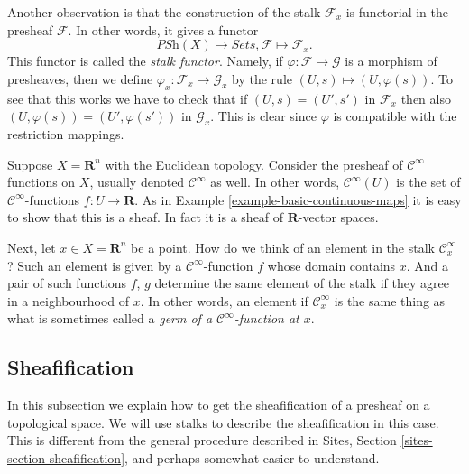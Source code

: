 \medskip\noindent
Another observation is that the construction of the stalk
$\mathcal{F}_x$ is functorial in the presheaf $\mathcal{F}$.
In other words, it gives a functor
$$
\textit{PSh}(X) \longrightarrow \textit{Sets},
\mathcal{F} \longmapsto \mathcal{F}_x.
$$
This functor is called the {\it stalk functor}.
Namely, if $\varphi : \mathcal{F} \to \mathcal{G}$ is 
a morphism of presheaves, then we define
$\varphi_x : \mathcal{F}_x \to \mathcal{G}_x$
by the rule $(U, s) \mapsto (U, \varphi(s))$.
To see that this works we have to check that
if $(U, s) = (U', s')$ in $\mathcal{F}_x$ then also
$(U, \varphi(s)) = (U', \varphi(s'))$ in $\mathcal{G}_x$.
This is clear since $\varphi$ is compatible with the
restriction mappings.

\begin{example}
\label{example-germs-functions}
Suppose $X = \mathbf{R}^n$ with the Euclidean topology.
Consider the presheaf of $\mathcal{C}^\infty$ functions
on $X$, usually denoted $\mathcal{C}^\infty$ as well.
In other words, $\mathcal{C}^\infty(U)$ is the set
of $\mathcal{C}^\infty$-functions $f : U \to \mathbf{R}$.
As in Example \ref{example-basic-continuous-maps}
it is easy to show that this is a sheaf. In fact it
is a sheaf of $\mathbf{R}$-vector spaces.

\medskip\noindent
Next, let $x \in X = \mathbf{R}^n$ be a point. How do
we think of an element in the stalk $\mathcal{C}^\infty_x$?
Such an element is given by a $\mathcal{C}^\infty$-function 
$f$ whose domain contains $x$. And a pair of such
functions $f$, $g$ determine
the same element of the stalk if they agree in a neighbourhood
of $x$. In other words, an element if $\mathcal{C}^\infty_x$
is the same thing as what is sometimes called
a {\it germ of a $\mathcal{C}^\infty$-function at $x$}.
\end{example}

\subsection{Sheafification}
\label{subsection-sheafification}

\noindent
In this subsection we explain how to get the sheafification
of a presheaf on a topological space. We will use stalks
to describe the sheafification in this case. This is different
from the general procedure described in Sites, Section
\ref{sites-section-sheafification}, and perhaps somewhat
easier to understand.

